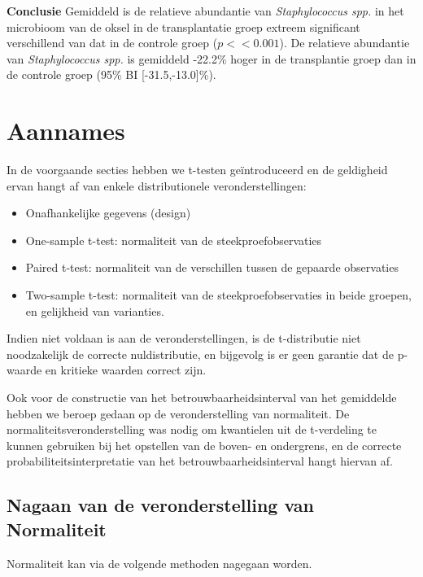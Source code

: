 \documentclass[
  12pt,dutch,coursenotes]{book}
\providecommand{\tightlist}{%
  \setlength{\itemsep}{0pt}\setlength{\parskip}{0pt}}
\theoremstyle{definition}
\theoremstyle{definition}
\theoremstyle{definition}
\theoremstyle{remark}
\begin{document}
\textbf{Conclusie}
Gemiddeld is de relatieve abundantie van \emph{Staphylococcus spp.} in het microbioom van de oksel in de transplantatie groep extreem significant verschillend van dat in de controle groep (\(p<<0.001\)). De relatieve abundantie van \emph{Staphylococcus spp.} is gemiddeld -22.2\% hoger in de transplantie groep dan in de controle groep (95\% BI {[}-31.5,-13.0{]}\%).

\hypertarget{aannames}{%
\section{Aannames}\label{aannames}}

In de voorgaande secties hebben we t-testen geïntroduceerd en de geldigheid ervan hangt af van enkele distributionele veronderstellingen:

\begin{itemize}
\tightlist
\item
  Onafhankelijke gegevens (design)
\item
  One-sample t-test: normaliteit van de steekproefobservaties
\item
  Paired t-test: normaliteit van de verschillen tussen de gepaarde observaties
\item
  Two-sample t-test: normaliteit van de steekproefobservaties in beide groepen, en gelijkheid van varianties.
\end{itemize}

Indien niet voldaan is aan de veronderstellingen, is de t-distributie niet noodzakelijk de correcte nuldistributie, en bijgevolg is er geen garantie dat de p-waarde en kritieke waarden correct zijn.

Ook voor de constructie van het betrouwbaarheidsinterval van het gemiddelde hebben we beroep gedaan op de veronderstelling van normaliteit. De normaliteitsveronderstelling was nodig om kwantielen uit de t-verdeling te kunnen gebruiken bij het opstellen van de boven- en ondergrens, en de correcte probabiliteitsinterpretatie van het betrouwbaarheidsinterval hangt hiervan af.

\hypertarget{nagaan-van-de-veronderstelling-van-normaliteit}{%
\subsection{Nagaan van de veronderstelling van Normaliteit}\label{nagaan-van-de-veronderstelling-van-normaliteit}}

Normaliteit kan via de volgende methoden nagegaan worden.
\end{document}
